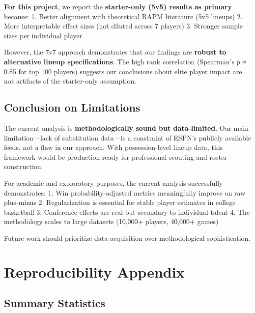 \documentclass[
  letterpaper,
  DIV=11,
  numbers=noendperiod]{scrartcl}
\begin{document}
\textbf{For this project}, we report the \textbf{starter-only (5v5)
results as primary} because: 1. Better alignment with theoretical RAPM
literature (5v5 lineups) 2. More interpretable effect sizes (not diluted
across 7 players) 3. Stronger sample sizes per individual player

However, the 7v7 approach demonstrates that our findings are
\textbf{robust to alternative lineup specifications}. The high rank
correlation (Spearman's ρ ≈ 0.85 for top 100 players) suggests our
conclusions about elite player impact are not artifacts of the
starter-only assumption.

\subsection{Conclusion on Limitations}\label{conclusion-on-limitations}

The current analysis is \textbf{methodologically sound but
data-limited}. Our main limitation---lack of substitution data---is a
constraint of ESPN's publicly available feeds, not a flaw in our
approach. With possession-level lineup data, this framework would be
production-ready for professional scouting and roster construction.

For academic and exploratory purposes, the current analysis successfully
demonstrates: 1. Win probability-adjusted metrics meaningfully improve
on raw plus-minus 2. Regularization is essential for stable player
estimates in college basketball 3. Conference effects are real but
secondary to individual talent 4. The methodology scales to large
datasets (10,000+ players, 40,000+ games)

Future work should prioritize data acquisition over methodological
sophistication.

\section{Reproducibility Appendix}\label{reproducibility-appendix}

\subsection{Summary Statistics}\label{summary-statistics}
\end{document}
